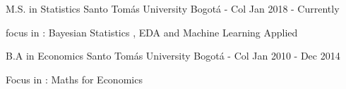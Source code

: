 

\begin{cventries}

  \cventry
    {M.S. in Statistics} %
    {Santo Tomás University} %
    {Bogotá - Col} %
    {Jan 2018 - Currently } %
    {
      \begin{cvitems} %
        \item {focus in : Bayesian Statistics , EDA and Machine Learning Applied }
      \end{cvitems}
    }

  


  \cventry
    {B.A in Economics} %
    {Santo Tomás University} %
    {Bogotá - Col} %
    {Jan 2010 - Dec 2014} %
    {
      \begin{cvitems} %
        \item {Focus in : Maths for Economics }
      \end{cvitems}
    }

\end{cventries}
